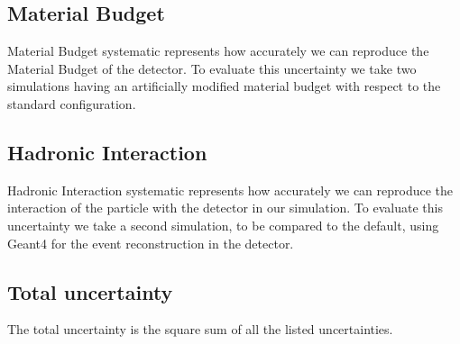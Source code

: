 \subsection{Material Budget}
Material Budget systematic represents how accurately we can reproduce the Material Budget of the detector. To evaluate this uncertainty we take two simulations having an artificially modified material budget with respect to the standard configuration.
\begin{comment}
In particular we will use \hl{... XYZ ...} productions. Those productions are made in p-Pb and have -7\% and +14\% of material budget. The uncertainty is evaluated taking the half of the fractiona variation between the efficiencies $\times$ acceptance in the two simulations. This procedure can be done as the material budget is strictly related to the detector structure and does not depend on the energy and/or collision system.
\end{comment}

\subsection{Hadronic Interaction}
Hadronic Interaction systematic represents how accurately we can reproduce the interaction of the particle with the detector in our simulation. To evaluate this uncertainty we take a second simulation, to be compared to the default, using Geant4 for the event reconstruction in the detector.

\subsection{Total uncertainty}
The total uncertainty is the square sum of all the listed uncertainties.
